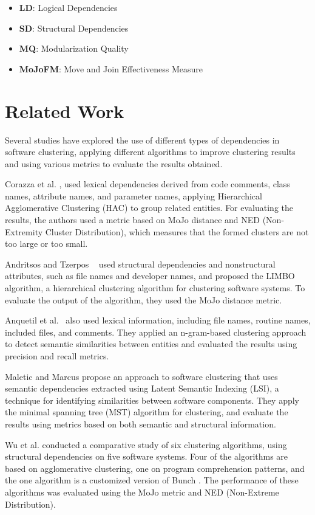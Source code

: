 \documentclass{ieeeaccess}
\begin{document}
\begin{itemize}
    \item \textbf{LD}: Logical Dependencies
    \item \textbf{SD}: Structural Dependencies
    \item \textbf{MQ}: Modularization Quality
    \item \textbf{MoJoFM}: Move and Join Effectiveness Measure
\end{itemize}

\section{Related Work}
\label{sec:related_work}

Several studies have explored the use of different types of dependencies in software clustering, applying different algorithms to improve clustering results and using various metrics to evaluate the results obtained.

Corazza et al. \cite{b13}, \cite{corazza2} used lexical dependencies derived from code comments, class names, attribute names, and parameter names, applying Hierarchical Agglomerative Clustering (HAC) to group related entities. For evaluating the results, the authors used a metric based on MoJo distance and NED (Non-Extremity Cluster Distribution), which measures that the formed clusters are not too large or too small.

Andritsos and Tzerpos ~\cite{tzerpos1} used structural dependencies and nonstructural attributes, such as file names and developer names, and proposed the LIMBO algorithm, a hierarchical clustering algorithm for clustering software systems. To evaluate the output of the algorithm, they used the MoJo distance metric.

Anquetil et al.~\cite{b14} also used lexical information, including file names, routine names, included files, and comments. They applied an n-gram-based clustering approach to detect semantic similarities between entities and evaluated the results using precision and recall metrics.

Maletic and Marcus \cite{maletic} propose an approach to software clustering that uses semantic dependencies extracted using Latent Semantic Indexing (LSI), a technique for identifying similarities between software components. They apply the minimal spanning tree (MST) algorithm for clustering, and evaluate the results using metrics based on both semantic and structural information.

Wu et al. \cite{wu} conducted a comparative study of six clustering algorithms, using structural dependencies on five software systems. Four of the algorithms are based on agglomerative clustering, one on program comprehension patterns, and the one  algorithm is a customized version of Bunch \cite{b10}. The performance of these algorithms was evaluated using the MoJo metric and NED (Non-Extreme Distribution).
\end{document}
